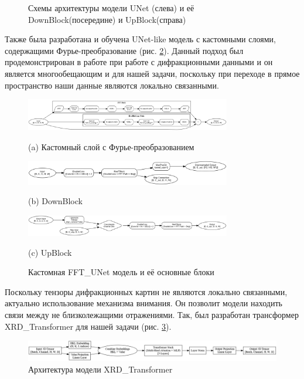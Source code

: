 \begin{figure}[H]
    \caption{Схемы архитектуры модели UNet (слева) и её DownBlock(посередине) и UpBlock(справа)}
    \label{unet}
\end{figure}

Также была разработана и обучена UNet-like модель с кастомными слоями, содержащими Фурье-преобразование (рис. \ref{fft_unet}). Данный подход был продемонстрирован в работе \cite{fft} при работе с дифракционными данными и он является многообещающим и для нашей задачи, поскольку при переходе в прямое пространство наши данные являются локально связанными.


\begin{figure}[H]
    \centering
    \includegraphics[width=0.8\textwidth]{figures/resf_block_architecture.png}
    \caption*{(a) Кастомный слой с Фурье-преобразованием}
    
    \vspace{1em}
    \includegraphics[width=0.8\textwidth]{figures/fft_down_block_architecture.png}
    \caption*{(b) DownBlock}
    
    \vspace{1em}
    \includegraphics[width=0.8\textwidth]{figures/fft_up_block_architecture.png}
    \caption*{(c) UpBlock}
    
    \caption{Кастомная FFT\_UNet модель и её основные блоки}
    \label{fft_unet}
\end{figure}

Поскольку тензоры дифракционных картин не являются локально связанными, актуально использование механизма внимания. Он позволит модели находить связи между не близколежащими отражениями. Так, был разработан трансформер XRD\_Transformer для нашей задачи (рис. \ref{XRDTrans}). 

\begin{figure}[H]
    \centering
    \includegraphics[width=1\textwidth]{figures/transformer.png}
    \caption{Архитектура модели XRD\_Transformer}
    \label{XRDTrans}
\end{figure}

